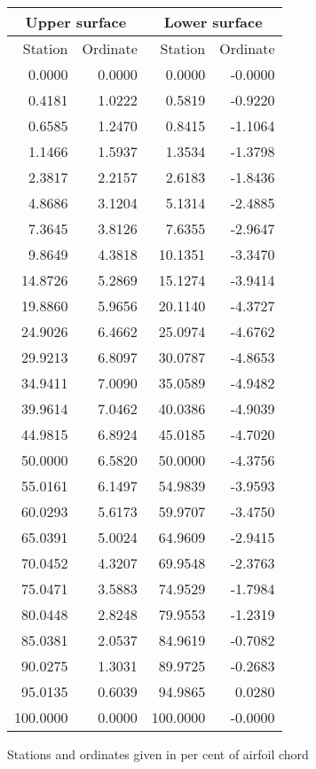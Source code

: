 \documentclass[11pt]{book}
\begin{document}
 \hspace{4mm}
 \begin{tabular}{|r|r|r|r|} \hline 
 \multicolumn{2}{|c|}{Upper surface} & \multicolumn{2}{|c|}{Lower surface} \\
 \hline
 Station & Ordinate & Station & Ordinate \\
 \hline
0.0000 & 0.0000 & 0.0000 & -0.0000 \\
0.4181 & 1.0222 & 0.5819 & -0.9220 \\
0.6585 & 1.2470 & 0.8415 & -1.1064 \\
1.1466 & 1.5937 & 1.3534 & -1.3798 \\
2.3817 & 2.2157 & 2.6183 & -1.8436 \\
4.8686 & 3.1204 & 5.1314 & -2.4885 \\
7.3645 & 3.8126 & 7.6355 & -2.9647 \\
9.8649 & 4.3818 & 10.1351 & -3.3470 \\
14.8726 & 5.2869 & 15.1274 & -3.9414 \\
19.8860 & 5.9656 & 20.1140 & -4.3727 \\
24.9026 & 6.4662 & 25.0974 & -4.6762 \\
29.9213 & 6.8097 & 30.0787 & -4.8653 \\
34.9411 & 7.0090 & 35.0589 & -4.9482 \\
39.9614 & 7.0462 & 40.0386 & -4.9039 \\
44.9815 & 6.8924 & 45.0185 & -4.7020 \\
50.0000 & 6.5820 & 50.0000 & -4.3756 \\
55.0161 & 6.1497 & 54.9839 & -3.9593 \\
60.0293 & 5.6173 & 59.9707 & -3.4750 \\
65.0391 & 5.0024 & 64.9609 & -2.9415 \\
70.0452 & 4.3207 & 69.9548 & -2.3763 \\
75.0471 & 3.5883 & 74.9529 & -1.7984 \\
80.0448 & 2.8248 & 79.9553 & -1.2319 \\
85.0381 & 2.0537 & 84.9619 & -0.7082 \\
90.0275 & 1.3031 & 89.9725 & -0.2683 \\
95.0135 & 0.6039 & 94.9865 & 0.0280 \\
100.0000 & 0.0000 & 100.0000 & -0.0000 \\
 \hline 
 \end{tabular}
 \vspace{8mm}

Stations and ordinates given in per cent of airfoil chord
\end{document}
